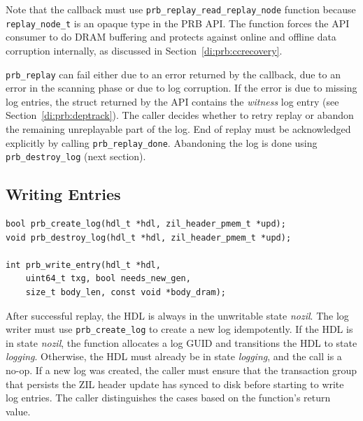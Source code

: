 \documentclass[12pt,a4paper,twoside]{book}
\begin{document}
{Note that the callback must use \lstinline{prb_replay_read_replay_node} function because \lstinline{replay_node_t} is an opaque type in the PRB API.
The function forces the API consumer to do DRAM buffering and protects against online and offline data corruption internally, as discussed in Section~\ref{di:prb:ccrecovery}.

\lstinline{prb_replay} can fail either due to an error returned by the callback, due to an error in the scanning phase or due to log corruption.
If the error is due to missing log entries, the struct returned by the API contains the \textit{witness} log entry (see Section~\ref{di:prb:deptrack}).
The caller decides whether to retry replay or abandon the remaining unreplayable part of the log.
End of replay must be acknowledged explicitly by calling \lstinline{prb_replay_done}.
Abandoning the log is done using \lstinline{prb_destroy_log} (next section).


\subsection{Writing Entries}\label{di:prb:api:write}

\begin{lstlisting}
bool prb_create_log(hdl_t *hdl, zil_header_pmem_t *upd);
void prb_destroy_log(hdl_t *hdl, zil_header_pmem_t *upd);

int prb_write_entry(hdl_t *hdl,
    uint64_t txg, bool needs_new_gen,
    size_t body_len, const void *body_dram);
\end{lstlisting}

After successful replay, the HDL is always in the unwritable state \textit{nozil}.
The log writer must use \lstinline{prb_create_log} to create a new log idempotently.
If the HDL is in state \textit{nozil}, the function allocates a log GUID and transitions the HDL to state \textit{logging}.
Otherwise, the HDL must already be in state \textit{logging}, and the call is a no-op.
If a new log was created, the caller must ensure that the transaction group that persists the ZIL header update has synced to disk before starting to write log entries.
The caller distinguishes the cases based on the function's return value.

}
\end{document}
